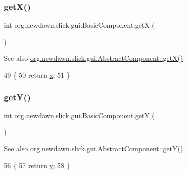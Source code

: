 \subsubsection{\texorpdfstring{get\+X()}{getX()}}
{\footnotesize\ttfamily int org.\+newdawn.\+slick.\+gui.\+Basic\+Component.\+getX (\begin{DoxyParamCaption}{ }\end{DoxyParamCaption})\hspace{0.3cm}{\ttfamily [inline]}}

\begin{DoxySeeAlso}{See also}
\mbox{\hyperlink{classorg_1_1newdawn_1_1slick_1_1gui_1_1_abstract_component_a9b0ebb0eb32e92db4475960bb5ceec19}{org.\+newdawn.\+slick.\+gui.\+Abstract\+Component\+::get\+X()}} 
\end{DoxySeeAlso}

\begin{DoxyCode}
49                       \{
50         \textcolor{keywordflow}{return} \mbox{\hyperlink{classorg_1_1newdawn_1_1slick_1_1gui_1_1_basic_component_ad0321d01a89b24e687e4e156fab90c67}{x}};
51     \}
\end{DoxyCode}
\mbox{\label{classorg_1_1newdawn_1_1slick_1_1gui_1_1_basic_component_a418061b7bfa93655d8aafaac9fe1ecb7}} 
\subsubsection{\texorpdfstring{get\+Y()}{getY()}}
{\footnotesize\ttfamily int org.\+newdawn.\+slick.\+gui.\+Basic\+Component.\+getY (\begin{DoxyParamCaption}{ }\end{DoxyParamCaption})\hspace{0.3cm}{\ttfamily [inline]}}

\begin{DoxySeeAlso}{See also}
\mbox{\hyperlink{classorg_1_1newdawn_1_1slick_1_1gui_1_1_abstract_component_aaae887135b1574e5b9bb73ee867c2244}{org.\+newdawn.\+slick.\+gui.\+Abstract\+Component\+::get\+Y()}} 
\end{DoxySeeAlso}

\begin{DoxyCode}
56                       \{
57         \textcolor{keywordflow}{return} \mbox{\hyperlink{classorg_1_1newdawn_1_1slick_1_1gui_1_1_basic_component_abca0dbce710368534eabb3f4168f47d5}{y}};
58     \}
\end{DoxyCode}
\mbox{\label{classorg_1_1newdawn_1_1slick_1_1gui_1_1_basic_component_a6c4aa44c60d479678b628478ecc3a4ec}} 
